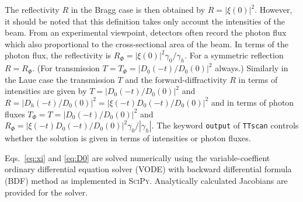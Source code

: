 \documentclass[11pt,a4paper]{article}
\begin{document}
The reflectivity $R$ in the Bragg case is then obtained by $R=|\xi(0)|^2$. However, it should be noted that this definition takes only account the intensities of the beam. From an experimental viewpoint, detectors often record the photon flux which also proportional to the cross-sectional area of the beam. In terms of the photon flux, the reflectivity is $R_\Phi = |\xi(0)|^2 \gamma_0/\gamma_h$. For a symmetric reflection $R=R_\Phi$. (For transmission $T = T_\Phi = |D_0(-t)/D_0(0)|^2$ always.) Similarly in the Laue case the transmission $T$ and the forward-diffractivity $R$ in terms of intensities are given by $T = |D_0(-t)/D_0(0)|^2$ and $R = |D_h(-t)/D_0(0)|^2 = |\xi(-t)D_0(-t)/D_0(0)|^2$ and in terms of photon fluxes $T_\Phi = T = |D_0(-t)/D_0(0)|^2$ and $R_\Phi = |\xi(-t)D_0(-t)/D_0(0)|^2  \gamma_0/|\gamma_h|$. The keyword \texttt{output} of \texttt{TTscan} controls whether the solution is given in terms of intensities or photon fluxes.

Eqs.~\eqref{eq:xi} and \eqref{eq:D0} are solved numerically using the variable-coeffient ordinary differential equation solver (VODE) with backward differential formula (BDF) method \cite{Brown_1989} as implemented in \textsc{SciPy}. Analytically calculated Jacobians are provided for the solver.
\end{document}
